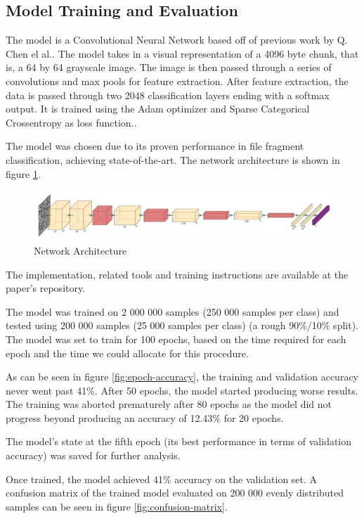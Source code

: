 \documentclass[conference]{IEEEtran}
\begin{document}
\subsection{Model Training and Evaluation}
\label{result:model}

The model is a Convolutional Neural Network based off of previous work by Q. Chen el al.. The model takes in a visual representation of a 4096 byte chunk, that is, a 64 by 64 grayscale image. The image is then passed through a series of convolutions and max pools for feature extraction. After feature extraction, the data is passed through two 2048 classification layers ending with a softmax output. It is trained using the Adam optimizer and Sparse Categorical Crossentropy as loss function.\cite{chen2018}.

The model was chosen due to its proven performance in file fragment classification, achieving state-of-the-art\cite{chen2018}. The network architecture is shown in figure \ref{fig:cnn}.

\begin{figure}
    \centering
    \includegraphics[scale=0.45]{model.pdf}
    \caption{Network Architecture}
    \label{fig:cnn}
\end{figure}

The implementation, related tools and training instructions are available at the paper's repository.

The model was trained on 2 000 000 samples (250 000 samples per class) and tested using 200 000 samples (25 000 samples per class) (a rough 90\%/10\% split). The model was set to train for 100 epochs, based on the time required for each epoch and the time we could allocate for this procedure.

As can be seen in figure \ref{fig:epoch-accuracy}, the training and validation accuracy never went past 41\%. After 50 epochs, the model started producing worse results. The training was aborted prematurely after 80 epochs as the model did not progress beyond producing an accuracy of 12.43\% for 20 epochs.

The model's state at the fifth epoch (its best performance in terms of validation accuracy) was saved for further analysis.

Once trained, the model achieved 41\% accuracy on the validation set. A confusion matrix of the trained model evaluated on 200 000 evenly distributed samples can be seen in figure \ref{fig:confusion-matrix}.
\end{document}
